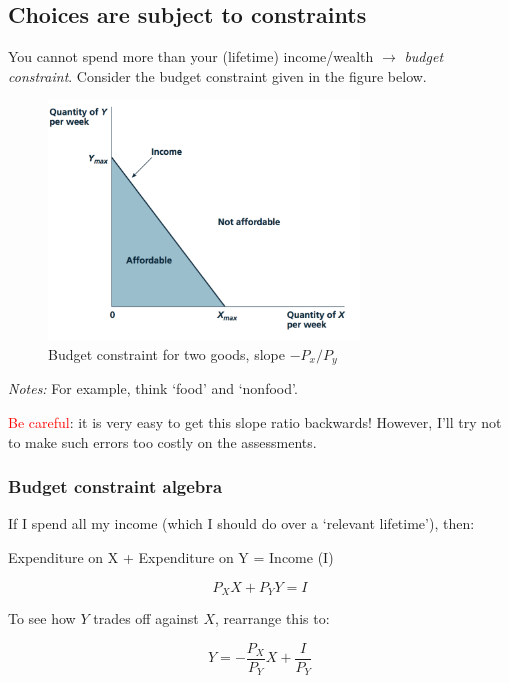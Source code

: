 \documentclass[]{article}
\begin{document}
\hypertarget{choices-are-subject-to-constraints}{%
\subsection{Choices are subject to constraints}\label{choices-are-subject-to-constraints}}

You cannot spend more than your (lifetime) income/wealth \(\rightarrow\) \emph{budget constraint}. Consider the budget constraint given in the figure below.

\begin{figure}[h]
  \centering
    \includegraphics[height=2.5in]{picsfigs/budgetconstraint.png}
  \caption[Budget constraint for two goods]
   {Budget constraint for two goods, slope $-P_x/P_y$}
\end{figure}

\emph{Notes:} For example, think `food' and `nonfood'.

\textcolor{red}{Be careful}: it is very easy to get this slope ratio backwards! However, I'll try not to make such errors too costly on the assessments.

\hypertarget{budget-constraint-algebra}{%
\subsubsection{Budget constraint algebra}\label{budget-constraint-algebra}}

If I spend all my income (which I should do over a `relevant lifetime'), then:

Expenditure on X + Expenditure on Y = Income (I)

\[P_X X + P_Y Y = I \]

\bigskip

To see how \(Y\) trades off against \(X\), rearrange this to:

\[Y = -\frac{P_X}{P_Y} X + \frac{I}{P_Y}\]
\end{document}
